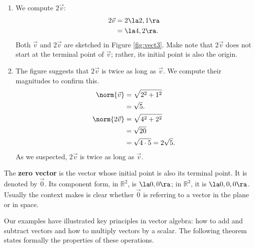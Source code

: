 {\begin{enumerate}
\item	We compute $2\vec v$:
	\begin{align*}
	2\vec v &= 2\la 2,1\ra\\
					&= \la 4,2\ra.
	\end{align*}
	Both $\vec v$ and $2\vec v$ are sketched in Figure \ref{fig:vect3}. Make note that $2\vec v$ does not start at the terminal point of $\vec v$; rather, its initial point is also the origin. 
	
\item		The figure suggests that $2\vec v$ is twice as long as $\vec v$. We compute their magnitudes to confirm this.
\begin{align*}
\norm{\vec v} &= \sqrt{2^2+1^2}\\
							&= \sqrt{5}.\\
\norm{2\vec v}&=\sqrt{4^2+2^2} \\
							&= \sqrt{20}\\
							&= \sqrt{4\cdot 5} = 2\sqrt{5}.
\end{align*}
As we suspected, $2\vec v$ is twice as long as $\vec v$.
\end{enumerate}}

The \textbf{zero vector} is the vector whose initial point is also its terminal point. It is denoted by $\vec 0$. Its component form, in $\mathbb{R}^2$, is $\la 0,0\ra$; in $\mathbb{R}^3$, it is $\la 0,0,0\ra$. Usually the context makes is clear whether $\vec 0$ is referring to a vector in the plane or in space.

Our examples have illustrated key principles in vector algebra: how to add and subtract vectors and how to multiply vectors by a scalar. The following theorem states formally the properties of these operations.
\clearpage

